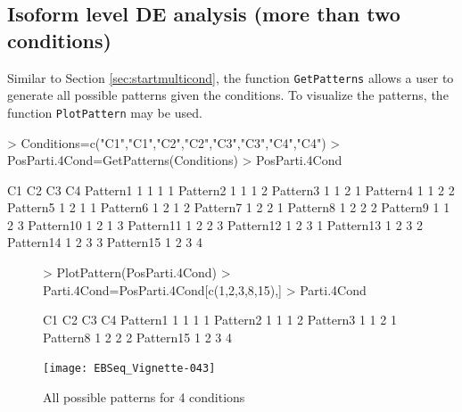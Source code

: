 \documentclass{article}
\begin{document}
\subsection{Isoform level DE analysis (more than two conditions)}
\label{sec:detailedisomulticond}
Similar to Section \ref{sec:startmulticond}, 
the function \verb+GetPatterns+ allows a user to generate all possible patterns given the conditions.
To visualize the patterns, the function \verb+PlotPattern+ may be used.
\begin{Schunk}
\begin{Sinput}
> Conditions=c("C1","C1","C2","C2","C3","C3","C4","C4")
> PosParti.4Cond=GetPatterns(Conditions)
> PosParti.4Cond
\end{Sinput}
\begin{Soutput}
          C1 C2 C3 C4
Pattern1   1  1  1  1
Pattern2   1  1  1  2
Pattern3   1  1  2  1
Pattern4   1  1  2  2
Pattern5   1  2  1  1
Pattern6   1  2  1  2
Pattern7   1  2  2  1
Pattern8   1  2  2  2
Pattern9   1  1  2  3
Pattern10  1  2  1  3
Pattern11  1  2  2  3
Pattern12  1  2  3  1
Pattern13  1  2  3  2
Pattern14  1  2  3  3
Pattern15  1  2  3  4
\end{Soutput}
\end{Schunk}
\newpage
\begin{figure}[h!]
\centering
\begin{Schunk}
\begin{Sinput}
> PlotPattern(PosParti.4Cond)
> Parti.4Cond=PosParti.4Cond[c(1,2,3,8,15),]
> Parti.4Cond
\end{Sinput}
\begin{Soutput}
          C1 C2 C3 C4
Pattern1   1  1  1  1
Pattern2   1  1  1  2
Pattern3   1  1  2  1
Pattern8   1  2  2  2
Pattern15  1  2  3  4
\end{Soutput}
\end{Schunk}
\texttt{[image: EBSeq\_Vignette-043]}
\caption{All possible patterns for 4 conditions}
\label{fig:Patterns4Cond}
\end{figure}
\end{document}
